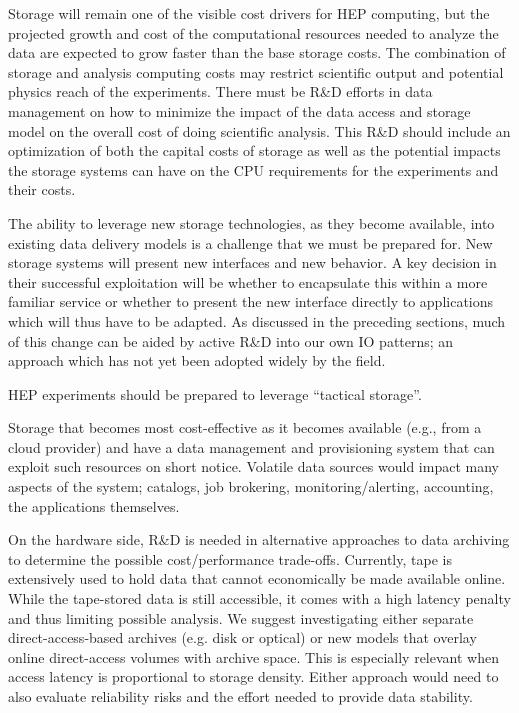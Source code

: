 \documentclass[12pt,a4paper]{article}
\begin{document}
Storage will remain one of the visible cost drivers for HEP computing,
but the projected growth and cost of the computational resources needed
to analyze the data are expected to grow faster than the base storage
costs. The combination of storage and analysis computing costs may
restrict scientific output and potential physics reach of the
experiments. There must be R\&D efforts in data management on how to
minimize the impact of the data access and storage model on the overall
cost of doing scientific analysis. This R\&D should include an
optimization of both the capital costs of storage as well as the
potential impacts the storage systems can have on the CPU requirements
for the experiments and their costs.

The ability to leverage new storage technologies, as they become
available, into existing data delivery models is a challenge that we must
be prepared for. New storage systems will present new interfaces and new
behavior. A key decision in their successful exploitation will be
whether to encapsulate this within a more familiar service or whether to
present the new interface directly to applications which will thus have
to be adapted. As discussed in the preceding sections, much of this
change can be aided by active R\&D into our own IO patterns; an approach
which has not yet been adopted widely by the field.

HEP experiments should be prepared to leverage ``tactical storage''.

Storage that becomes most cost-effective as it becomes available (e.g.,
from a cloud provider) and have a data management and provisioning
system that can exploit such resources on short notice. Volatile data
sources would impact many aspects of the system; catalogs, job
brokering, monitoring/alerting, accounting, the applications themselves.

On the hardware side, R\&D is needed in alternative approaches to data
archiving to determine the possible cost/performance trade-offs.
Currently, tape is extensively used to hold data that cannot economically be made available online. While the tape-stored data is still accessible,
it comes with a high latency penalty and thus limiting possible analysis. We suggest investigating either separate direct-access-based archives (e.g.
disk or optical) or new models that overlay online direct-access volumes
with archive space. This is especially relevant when access latency is
proportional to storage density. Either approach would need to also
evaluate reliability risks and the effort needed to provide data
stability.
\end{document}

